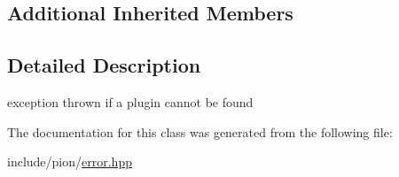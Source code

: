\subsection*{Additional Inherited Members}


\subsection{Detailed Description}
exception thrown if a plugin cannot be found 

The documentation for this class was generated from the following file\-:\begin{DoxyCompactItemize}
\item 
include/pion/\hyperlink{error_8hpp}{error.\-hpp}\end{DoxyCompactItemize}
